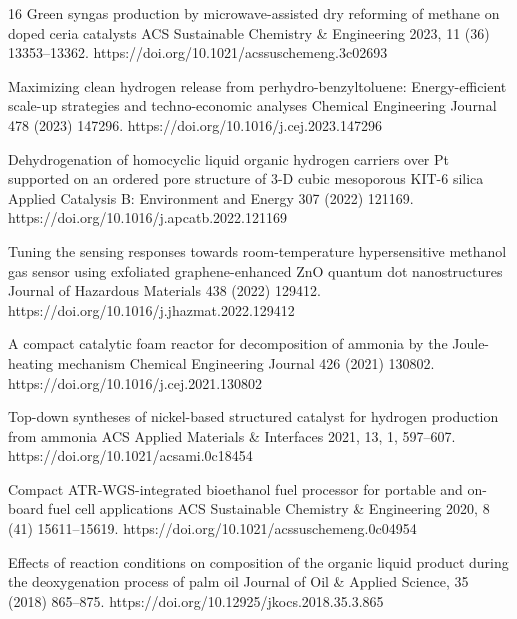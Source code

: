 \begin{publist}{16}
    {Green syngas production by microwave-assisted dry reforming of methane on doped ceria
     catalysts}
    {ACS Sustainable Chemistry \& Engineering}{ 2023, 11 (36) 13353--13362.}
    {https://doi.org/10.1021/acssuschemeng.3c02693}

    {Maximizing clean hydrogen release from perhydro-benzyltoluene: Energy-efficient scale-up
     strategies and techno-economic analyses}
    {Chemical Engineering Journal}{ 478 (2023) 147296.}
    {https://doi.org/10.1016/j.cej.2023.147296}

    {Dehydrogenation of homocyclic liquid organic hydrogen carriers over Pt supported on an
     ordered pore structure of 3-D cubic mesoporous KIT-6 silica}
    {Applied Catalysis B: Environment and Energy}{ 307 (2022) 121169.}
    {https://doi.org/10.1016/j.apcatb.2022.121169}

    {Tuning the sensing responses towards room-temperature hypersensitive methanol gas sensor
     using exfoliated graphene-enhanced ZnO quantum dot nanostructures}
    {Journal of Hazardous Materials}{ 438 (2022) 129412.}
    {https://doi.org/10.1016/j.jhazmat.2022.129412}

    {A compact catalytic foam reactor for decomposition of ammonia by the Joule-heating
     mechanism}
    {Chemical Engineering Journal}{ 426 (2021) 130802.}
    {https://doi.org/10.1016/j.cej.2021.130802}

    {Top-down syntheses of nickel-based structured catalyst for hydrogen production from
     ammonia}
    {ACS Applied Materials \& Interfaces}{ 2021, 13, 1, 597--607.}
    {https://doi.org/10.1021/acsami.0c18454}

    {Compact ATR-WGS-integrated bioethanol fuel processor for portable and on-board fuel cell
     applications}
    {ACS Sustainable Chemistry \& Engineering}{ 2020, 8 (41) 15611--15619.}
    {https://doi.org/10.1021/acssuschemeng.0c04954}

    {Effects of reaction conditions on composition of the organic liquid product during the
     deoxygenation process of palm oil}
    {Journal of Oil \& Applied Science}{, 35 (2018) 865--875.}
    {https://doi.org/10.12925/jkocs.2018.35.3.865}

\end{publist}

